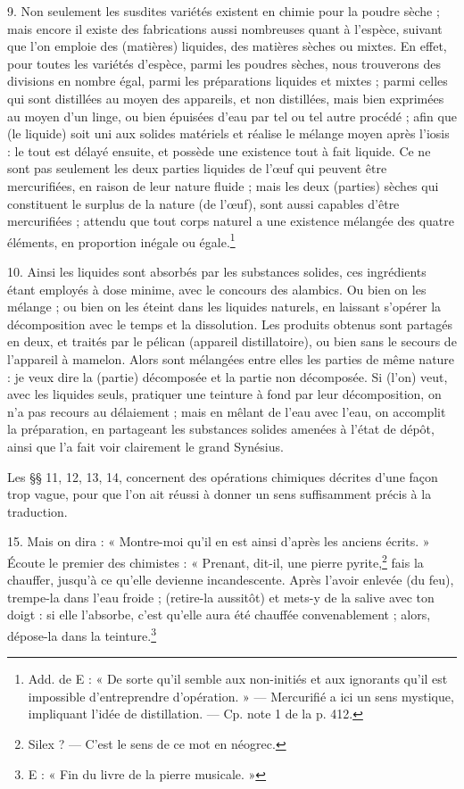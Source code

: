 \documentclass[a4paper, 11pt, oneside, polutonikogreek, french]{article}
\begin{document}
9. Non seulement les susdites variétés existent en chimie pour la poudre sèche ; mais encore il existe des fabrications aussi nombreuses quant à l'espèce, suivant que l'on emploie des (matières) liquides, des matières sèches ou mixtes. En effet, pour toutes les variétés d'espèce, parmi les poudres sèches, nous trouverons des divisions en nombre égal, parmi les préparations liquides et mixtes ; parmi celles qui sont distillées au moyen des appareils, et non distillées, mais bien exprimées au moyen d'un linge, ou bien épuisées d'eau par tel ou tel autre procédé ; afin que (le liquide) soit uni aux solides matériels et réalise le mélange moyen après l'iosis : le tout est délayé ensuite, et possède une existence tout à fait liquide. Ce ne sont pas seulement les deux parties liquides de l'œuf qui peuvent être mercurifiées, en raison de leur nature fluide ; mais les deux (parties) sèches qui constituent le surplus de la nature (de l'œuf), sont aussi capables d'être mercurifiées ; attendu que tout corps naturel a une existence mélangée des quatre éléments, en proportion inégale ou égale.\footnote{Add. de E : « De sorte qu'il semble aux non-initiés et aux ignorants qu'il est impossible d'entreprendre d'opération. » --- Mercurifié a ici un sens mystique, impliquant l'idée de distillation. --- Cp. note 1 de la p. 412.}

10. Ainsi les liquides sont absorbés par les substances solides, ces ingrédients étant employés à dose minime, avec le concours des alambics. Ou bien on les mélange ; ou bien on les éteint dans les liquides naturels, en laissant s'opérer la décomposition avec le temps et la dissolution. Les produits obtenus sont partagés en deux, et traités par le pélican (appareil distillatoire), ou bien sans le secours de l'appareil à mamelon. Alors sont mélangées entre elles les parties de même nature : je veux dire la (partie) décomposée et la partie non décomposée. Si (l'on) veut, avec les liquides seuls, pratiquer une teinture à fond par leur décomposition, on n'a pas recours au délaiement ; mais en mêlant de l'eau avec l'eau, on accomplit la préparation, en partageant les substances solides amenées à l'état de dépôt, ainsi que l'a fait voir clairement le grand Synésius.

Les §§ 11, 12, 13, 14, concernent des opérations chimiques décrites d'une façon trop vague, pour que l'on ait réussi à donner un sens suffisamment précis à la traduction.

15. Mais on dira : « Montre-moi qu'il en est ainsi d'après les anciens écrits. » Écoute le premier des chimistes : « Prenant, dit-il, une pierre pyrite,\footnote{Silex ? --- C'est le sens de ce mot en néogrec.} fais la chauffer, jusqu'à ce qu'elle devienne incandescente. Après l'avoir enlevée (du feu), trempe-la dans l'eau froide ; (retire-la aussitôt) et mets-y de la salive avec ton doigt : si elle l'absorbe, c'est qu'elle aura été chauffée convenablement ; alors, dépose-la dans la teinture.\footnote{E : « Fin du livre de la pierre musicale. »}
\end{document}

